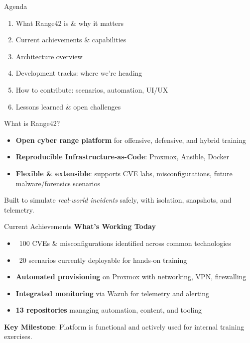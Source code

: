 \documentclass[aspectratio=169]{beamer}
\begin{document}
\begin{frame}{Agenda}
  \begin{enumerate}
    \item What Range42 is \& why it matters
    \item Current achievements \& capabilities
    \item Architecture overview
    \item Development tracks: where we're heading
    \item How to contribute: scenarios, automation, UI/UX
    \item Lessons learned \& open challenges
  \end{enumerate}
\end{frame}

\begin{frame}{What is Range42?}
  \begin{itemize}
    \item \textbf{Open cyber range platform} for offensive, defensive, and hybrid training
    \item \textbf{Reproducible Infrastructure-as-Code}: Proxmox, Ansible, Docker
    \item \textbf{Flexible \& extensible}: supports CVE labs, misconfigurations, future malware/forensics scenarios
  \end{itemize}
  \begin{tcolorbox}
    \faInfoCircle\; Built to simulate \emph{real-world incidents} safely, with isolation, snapshots, and telemetry.
  \end{tcolorbox}
\end{frame}

\begin{frame}{Current Achievements \; \faCheckCircle}
  \textbf{What's Working Today}
  \begin{itemize}
    \item \alert{~100 CVEs \& misconfigurations identified} across common technologies
    \item \alert{~20 scenarios currently deployable} for hands-on training
    \item \textbf{Automated provisioning} on Proxmox with networking, VPN, firewalling
    \item \textbf{Integrated monitoring} via Wazuh for telemetry and alerting
    \item \textbf{13 repositories} managing automation, content, and tooling
  \end{itemize}
  \vspace{2mm}
  \begin{tcolorbox}
    \faLightbulb\; \textbf{Key Milestone}: Platform is functional and actively used for internal training exercises.
  \end{tcolorbox}
\end{frame}
\end{document}
